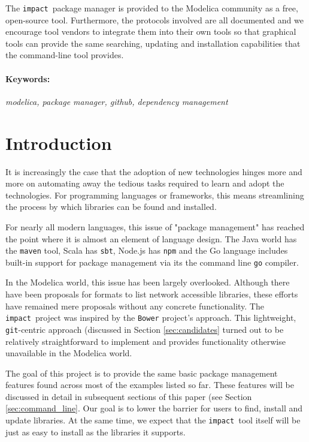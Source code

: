 \documentclass[11pt,a4paper,twocolumn]{article}
\newcommand{\impact}{\texttt{impact}} %
\newcommand{\code}[1]{\texttt{#1}} %
\begin{document}
The \impact\ package manager is provided to the Modelica community as
a free, open-source tool.  Furthermore, the protocols involved are all
documented and we encourage tool vendors to integrate them into their
own tools so that graphical tools can provide the same searching,
updating and installation capabilities that the command-line tool
provides.

\paragraph{Keywords:}
\emph{modelica, package manager, github, dependency management}

\section{Introduction}
\label{sec:intro}

It is increasingly the case that the adoption of new technologies hinges more
and more on automating away the tedious tasks required to learn and adopt the
technologies.  For programming languages or frameworks, this means streamlining
the process by which libraries can be found and installed.

For nearly all modern languages, this issue of "package management" has reached
the point where it is almost an element of language design.  The Java world has 
the \code{maven} tool, Scala has \code{sbt}, Node.js has \code{npm} and the Go 
language includes built-in support for package management via its the command line 
\code{go} compiler.

In the Modelica world, this issue has been largely overlooked.  Although there
have been proposals for formats to list network accessible libraries, these 
efforts have remained mere proposals without any concrete functionality.  The
\impact\ project was inspired by the \code{Bower}\cite{Bower} project's approach.  
This lightweight, \code{git}-centric approach (discussed in Section
\ref{sec:candidates} turned out to be relatively straightforward to implement and 
provides functionality otherwise unavailable in the Modelica world.

The goal of this project is to provide the same basic package management features 
found across most of the examples listed so far.  These features will be discussed 
in detail in subsequent sections of this paper (see Section \ref{sec:command_line}.
Our goal is to lower the barrier for users to find, install and update libraries.  
At the same time, we expect that the \impact\ tool itself will be just as easy to 
install as the libraries it supports.
\end{document}

